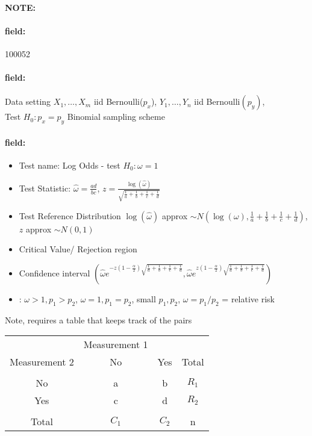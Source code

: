 \documentclass[12pt]{article}
\newenvironment{note}{\paragraph{NOTE:}}{}
\newenvironment{field}{\paragraph{field:}}{}
\begin{document}
\begin{note} \begin{field} \tiny 100052 \end{field}
 \begin{field}
  Data setting $X_1, \ldots , X_m$ iid Bernoulli($p_x$), $Y_1, \ldots, Y_n$ iid Bernoulli$(p_y)$,\\ Test $H_0: p_x = p_y $ Binomial sampling scheme
 \end{field}
 \begin{field}
  \begin{itemize}
   \item Test name: Log Odds - test $H_0: \omega = 1$
   \item Test Statistic: $\hat{\omega} = \frac{ad}{bc}$, $z = \frac{\log(\hat{\omega})}{\sqrt{\frac{1}{a} + \frac{1}{b} + \frac{1}{c} + \frac{1}{d}}}$
   \item Test Reference Distribution $ \log(\hat{\omega}) $ approx $\sim N(\log(\omega), \frac{1}{a} + \frac{1}{b} + \frac{1}{c} + \frac{1}{d})$, $z $ approx $\sim N(0,1)$
   \item Critical Value/ Rejection region
   \item Confidence interval $(\hat{\omega}e^{-z(1 - \frac{\alpha}{2})\sqrt{\frac{1}{a} + \frac{1}{b} + \frac{1}{c} + \frac{1}{d}}}, \hat{\omega}e^{z(1 - \frac{\alpha}{2})\sqrt{\frac{1}{a} + \frac{1}{b} + \frac{1}{c} + \frac{1}{d}}})$
   \item: $\omega > 1, p_1 > p_2$, $\omega = 1, p_1 = p_2$, small $p_1, p_2$, $\omega = p_1/p_2$ = relative risk
  \end{itemize}
  Note, requires a table that keeps track of the pairs
        \begin{tabular}{|c|c c|c|}
                       & Measurement 1 &       &       \\
         Measurement 2 & No            & Yes   & Total \\
         \hline                                        \\
         No            & a             & b     & $R_1$ \\
         Yes           & c             & d     & $R_2$ \\
         \hline                                        \\
         Total         & $C_1$         & $C_2$ & n     \\
         \hline
        \end{tabular}
 \end{field}
\end{note}
\end{document}
